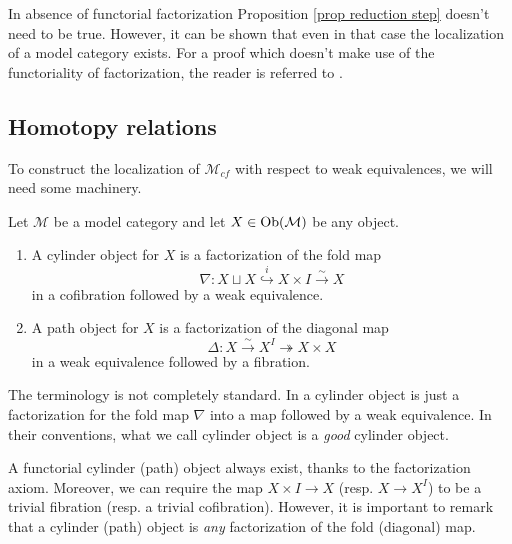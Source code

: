 \begin{rmk}
In absence of functorial factorization Proposition \ref{prop reduction step} doesn't need to be true. However, it can be shown that even in that case the localization of a model category exists. For a proof which doesn't make use of the functoriality of factorization, the reader is referred to \cite[Section 4]{dwsp}.
\end{rmk}

\subsection{Homotopy relations}

To construct the localization of $\mathcal M_{cf}$ with respect to weak equivalences, we will need some machinery.

\begin{defin}
Let $\mathcal M$ be a model category and let $X \in \mathrm{Ob}(\mathcal M)$ be any object.
\begin{enumerate}

\item A cylinder object for $X$ is a factorization of the fold map
\[
\nabla \colon X \sqcup X \stackrel{i}{\hookrightarrow} X \times I \stackrel{\sim}{\to} X
\]
in a cofibration followed by a weak equivalence.

\item A path object for $X$ is a factorization of the diagonal map
\[
\Delta \colon X \stackrel{\sim}{\to} X^I \twoheadrightarrow X \times X
\]
in a weak equivalence followed by a fibration.
\end{enumerate}
\end{defin}

\begin{rmk}
The terminology is not completely standard. In \cite{dwsp} a cylinder object is just a factorization for the fold map $\nabla$ into a map followed by a weak equivalence. In their conventions, what we call cylinder object is a \emph{good} cylinder object.
\end{rmk}

\begin{rmk}
A functorial cylinder (path) object always exist, thanks to the factorization axiom. Moreover, we can require the map $X \times I \to X$ (resp. $X \to X^I$) to be a trivial fibration (resp. a trivial cofibration). However, it is important to remark that a cylinder (path) object is \emph{any} factorization of the fold (diagonal) map.
\end{rmk}

